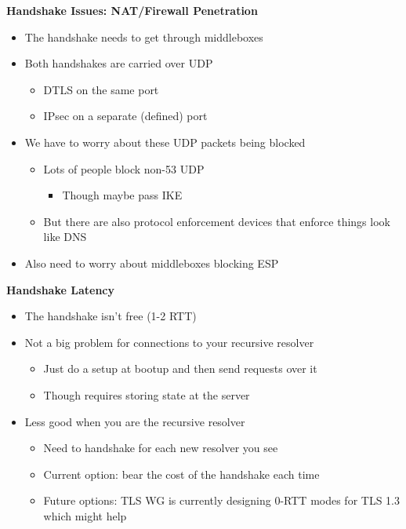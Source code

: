 \documentclass[helvetica]{seminar}
\newcommand{\heading}[1]{%
  \begin{center} 
    \large\bf 
    #1 
  \end{center} 
  \vspace{.4 in}}
\begin{document}
\begin{slide}
\heading{Handshake Issues: NAT/Firewall Penetration}

\begin{itemize}
\item The handshake needs to get through middleboxes
\item Both handshakes are carried over UDP
  \begin{itemize}
  \item DTLS on the same port
  \item IPsec on a separate (defined) port
  \end{itemize}

\item We have to worry about these UDP packets being blocked
  \begin{itemize}
    \item Lots of people block non-53 UDP
      \begin{itemize}
      \item Though maybe pass IKE
      \end{itemize}
    \item But there are also protocol enforcement devices that enforce things look like DNS
  \end{itemize}

\item Also need to worry about middleboxes blocking ESP
\end{itemize}
\end{slide}

\begin{slide}
\heading{Handshake Latency}

\begin{itemize}
\item The handshake isn't free (1-2 RTT)
\item Not a big problem for connections to your recursive resolver
  \begin{itemize}
  \item Just do a setup at bootup and then send requests over it
  \item Though requires storing state at the server
  \end{itemize}

\item Less good when you are the recursive resolver
  \begin{itemize}
  \item Need to handshake for each new resolver you see
  \item Current option: bear the cost of the handshake each time
  \item Future options: TLS WG is currently designing 0-RTT modes for TLS 1.3 which might help
  \end{itemize}
\end{itemize}
\end{slide}
\end{document}
